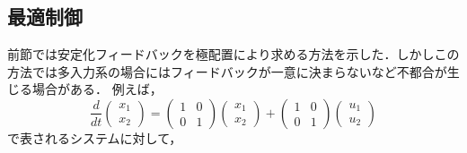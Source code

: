 \subsection{最適制御 \label{sec_opt}}
前節では安定化フィードバックを極配置により求める方法を示した．しかしこの
方法では多入力系の場合にはフィードバックが一意に決まらないなど不都合が生
じる場合がある．
例えば，
\[
 \frac{d}{dt}
 \left(
 \begin{array}{c}
  x_1 \\
  x_2
 \end{array}
 \right) =
 \left(
 \begin{array}{cc}
  1 & 0 \\
  0 & 1
 \end{array}
 \right) 
 \left(
 \begin{array}{c}
  x_1 \\
  x_2
 \end{array}
 \right) +
 \left(
 \begin{array}{cc}
  1 & 0 \\
  0 & 1
 \end{array}
 \right)
 \left(
 \begin{array}{c}
  u_1 \\
  u_2
 \end{array}
 \right)
\]
で表されるシステムに対して，
